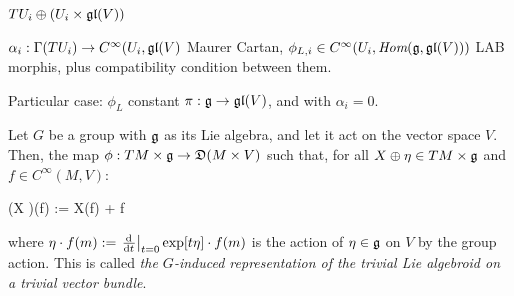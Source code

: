 \begin{example}
\label{exampleDerivationsLieAlgebroidOfATrivialVectorBundleglV}
$TU_i \oplus (U_i \times \mathfrak{gl}(V))$
\end{example}


\begin{example}
\label{exampleAllRepresentationsofTLAoverTrivialVectorbundle}
$\alpha_i: \Gamma(TU_i) \to C^\infty(U_i, \mathfrak{gl}(V)$ Maurer Cartan, $\phi_{L, i} \in C^\infty(U_i, \Hom(\alg g, \alg{gl}(V)))$ LAB morphis, plus compatibility condition between them.
\end{example}


\begin{example}
\label{definitionExampleGroupInducedRepresentationTrivialLieAlgebroidTLAOnTrivialVectorBundle}
Particular case: $\phi_L$ constant $\pi: \mathfrak{g} \to \mathfrak{gl}(V)$, and with $\alpha_i = 0$.

Let $G$ be a group with $\mathfrak{g}$ as its Lie algebra, and let it act on the vector space $V$. Then, the map $\phi: TM \times \alg g \to \alg D(M \times V)$ such that, for all $X \oplus \eta \in TM \times \mathfrak{g}$ and $f \in C^\infty(M, V)$:
\begin{eqnsplit}
    \phi(X \oplus \eta)(f) := X(f) + \eta \cdot f
\end{eqnsplit}
where $\eta \cdot f(m) := \der{t}[t=0]{\exp[t \eta] \cdot f(m)}$ is the action of $\eta \in \mathfrak{g}$ on $V$ by the group action. This is called \emph{the $G$-induced representation of the trivial Lie algebroid on a trivial vector bundle}.
\end{example}


